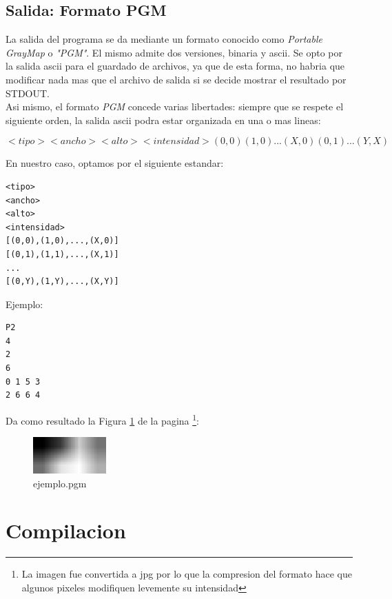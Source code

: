 \documentclass[10pt,spanish,a4paper,openany,notitlepage]{article}
\begin{document}
\subsection{Salida: Formato PGM}

La salida del programa se da mediante un formato conocido como \textit{Portable GrayMap} o  \textit{"PGM"}. El mismo admite dos versiones, binaria y ascii. Se opto por la salida ascii para el guardado de archivos, ya que de esta
forma, no habria que modificar nada mas que el archivo de salida si se decide mostrar el resultado por STDOUT.\\
Asi mismo, el formato \textit{PGM} concede varias libertades: siempre que se respete el siguiente orden, la salida ascii podra estar organizada en una o mas lineas:

\[ <tipo> <ancho> <alto> <intensidad> (0,0) (1,0) ... (X,0) (0,1) ... (Y,X)  \] 

En nuestro caso, optamos por el siguiente estandar:

\begin{framed}
\begin{verbatim}<tipo>
<ancho>
<alto>
<intensidad>
[(0,0),(1,0),...,(X,0)]
[(0,1),(1,1),...,(X,1)]
...
[(0,Y),(1,Y),...,(X,Y)]\end{verbatim}
\end{framed}


Ejemplo:
\begin{framed}
\begin{verbatim}P2
4
2
6
0 1 5 3
2 6 6 4\end{verbatim}
\end{framed}

Da como resultado la Figura \ref{ej} de la pagina \pageref{ej}\footnote{La imagen fue convertida a jpg por lo que la compresion del formato hace que algunos pixeles modifiquen levemente su intensidad}:

\begin{figure}[hbt]
\centering
\includegraphics[width=0.25\textwidth]{asd.jpg}
\caption{ejemplo.pgm}
\label{ej}
\end{figure}

\section{Compilacion}
\end{document}
